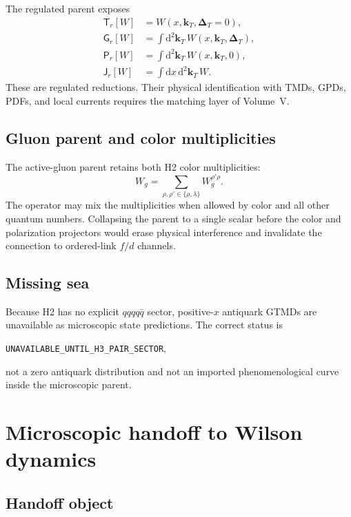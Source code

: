 \documentclass[11pt]{article}
\newcommand{\kT}{\bm{k}_{T}}
\newcommand{\DT}{\bm{\Delta}_{T}}
\newcommand{\dd}{\mathrm{d}}
\begin{document}
The regulated parent exposes
\begin{align}
 \mathsf T_r[W]
 &=W(x,\kT,\DT=0),\\
 \mathsf G_r[W]
 &=\int\dd^2\kT\,W(x,\kT,\DT),\\
 \mathsf P_r[W]
 &=\int\dd^2\kT\,W(x,\kT,0),\\
 \mathsf J_r[W]
 &=\int\dd x\,\dd^2\kT\,W.
\end{align}
These are regulated reductions.  Their physical identification with TMDs,
GPDs, PDFs, and local currents requires the matching layer of Volume~V.

\subsection{Gluon parent and color multiplicities}

The active-gluon parent retains both H2 color multiplicities:
\begin{equation}
 W_g
 =
 \sum_{\rho,\rho'\in\{\rho,\lambda\}}
 W_g^{\rho'\rho}.
\end{equation}
The operator may mix the multiplicities when allowed by color and all other
quantum numbers.  Collapsing the parent to a single scalar before the color and
polarization projectors would erase physical interference and invalidate the
connection to ordered-link \(f/d\) channels.

\subsection{Missing sea}

Because H2 has no explicit \(qqqq\bar q\) sector, positive-\(x\) antiquark
GTMDs are unavailable as microscopic state predictions.  The correct status is
\begin{center}
\texttt{UNAVAILABLE\_UNTIL\_H3\_PAIR\_SECTOR},
\end{center}
not a zero antiquark distribution and not an imported phenomenological curve
inside the microscopic parent.

\section{Microscopic handoff to Wilson dynamics}

\subsection{Handoff object}
\end{document}
